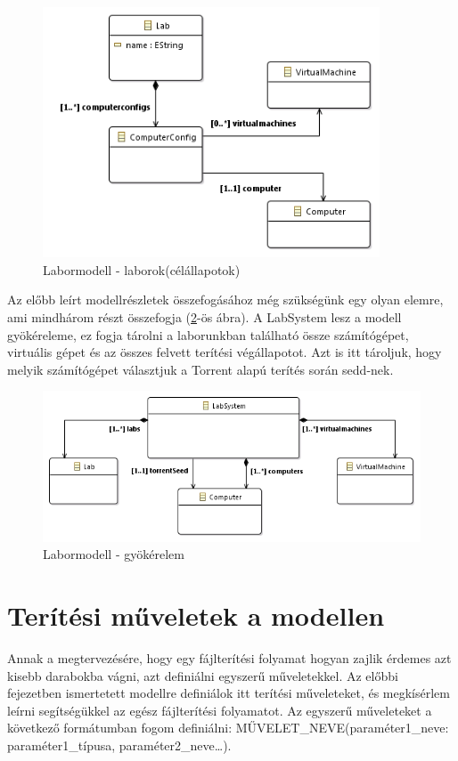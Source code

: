 \begin{figure}[h!]
	\centering
	\includegraphics[width=100mm, keepaspectratio]{figures/design_lab.png}
	\caption{Labormodell - laborok(célállapotok)}
	\label{fig:designlab}
\end{figure}

Az előbb leírt modellrészletek összefogásához még szükségünk egy olyan elemre, ami mindhárom részt összefogja (\ref{fig:designmodelroot}-ös ábra). A LabSystem lesz a modell gyökéreleme, ez fogja tárolni a laborunkban található össze számítógépet, virtuális gépet és az összes felvett terítési végállapotot. Azt is itt tároljuk, hogy melyik számítógépet választjuk a Torrent alapú terítés során sedd-nek.

\begin{figure}[h!]
	\centering
	\includegraphics[width=130mm, keepaspectratio]{figures/design_modelroot.png}
	\caption{Labormodell - gyökérelem}
	\label{fig:designmodelroot}
\end{figure}

\section{Terítési műveletek a modellen}

Annak a megtervezésére, hogy egy fájlterítési folyamat hogyan zajlik érdemes azt kisebb darabokba vágni, azt definiálni egyszerű műveletekkel.
Az előbbi fejezetben ismertetett modellre definiálok itt terítési műveleteket, és megkísérlem leírni segítségükkel az egész fájlterítési folyamatot.
Az egyszerű műveleteket a következő formátumban fogom definiálni: MŰVELET\_NEVE(paraméter1\_neve: paraméter1\_típusa, paraméter2\_neve\ldots).

